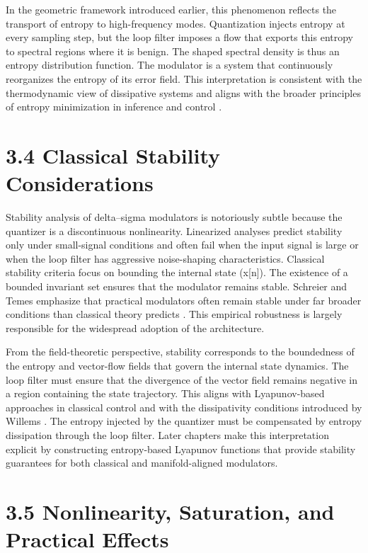 In the geometric framework introduced earlier, this phenomenon reflects the transport of entropy to high-frequency modes. Quantization injects entropy at every sampling step, but the loop filter imposes a flow that exports this entropy to spectral regions where it is benign. The shaped spectral density is thus an entropy distribution function. The modulator is a system that continuously reorganizes the entropy of its error field. This interpretation is consistent with the thermodynamic view of dissipative systems \citep{willems1972dissipative} and aligns with the broader principles of entropy minimization in inference and control \citep{friston2019free}.

\section*{3.4 Classical Stability Considerations}

Stability analysis of delta--sigma modulators is notoriously subtle because the quantizer is a discontinuous nonlinearity. Linearized analyses predict stability only under small-signal conditions and often fail when the input signal is large or when the loop filter has aggressive noise-shaping characteristics. Classical stability criteria focus on bounding the internal state (x[n]). The existence of a bounded invariant set ensures that the modulator remains stable. Schreier and Temes emphasize that practical modulators often remain stable under far broader conditions than classical theory predicts \citep{schreier2005understanding}. This empirical robustness is largely responsible for the widespread adoption of the architecture.

From the field-theoretic perspective, stability corresponds to the boundedness of the entropy and vector-flow fields that govern the internal state dynamics. The loop filter must ensure that the divergence of the vector field remains negative in a region containing the state trajectory. This aligns with Lyapunov-based approaches in classical control and with the dissipativity conditions introduced by Willems \citep{willems1972dissipative}. The entropy injected by the quantizer must be compensated by entropy dissipation through the loop filter. Later chapters make this interpretation explicit by constructing entropy-based Lyapunov functions that provide stability guarantees for both classical and manifold-aligned modulators.

\section*{3.5 Nonlinearity, Saturation, and Practical Effects}

